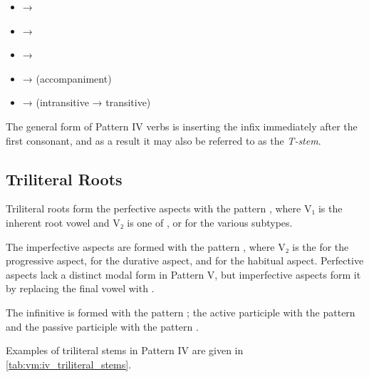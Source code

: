\documentclass[grammar]{subfiles}
\begin{document}
\begin{itemize}
  \item {} → 
  \item {} → 
  \item {} → 
  \item {} →  (accompaniment)
  \item {} →  (intransitive → transitive)
\end{itemize}

The general form of Pattern IV verbs is inserting the infix  immediately
after the first consonant, and as a result it may also be referred to as the \emph{T-stem}. 


\subsection{Triliteral Roots}
\label{ssec:vm:iv_triliteral_roots}

Triliteral roots form the perfective aspects with the pattern
, where V₁ is the inherent root vowel and V₂ is one of ,
 or  for the various subtypes.  

The imperfective aspects are formed with the pattern , where
V₂ is the  for the progressive aspect,  for the durative aspect,
and  for the habitual aspect.  Perfective aspects lack a distinct modal
form in Pattern V, but imperfective aspects form it by replacing the final
vowel with . 

The infinitive is formed with the pattern ; the active
participle with the pattern  and the passive participle with the
pattern . 

Examples of triliteral stems in Pattern IV are given in
\cref{tab:vm:iv_triliteral_stems}. 
\end{document}
